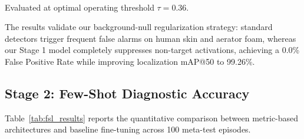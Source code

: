 \documentclass[conference]{IEEEtran}
\begin{document}
\begin{table}[htbp]
\caption{Stage 1 Universal Detector Performance and OOD Rejection}
\label{tab:detector_perf}
\centering
{}
\vspace{1mm}\\
{\footnotesize *Evaluated at optimal operating threshold $\tau = 0.36$.}
\end{table}

The results validate our background-null regularization strategy: standard detectors trigger frequent false alarms on human skin and aerator foam, whereas our Stage 1 model completely suppresses non-target activations, achieving a 0.0\% False Positive Rate while improving localization mAP@50 to 99.26\%.

\subsection{Stage 2: Few-Shot Diagnostic Accuracy}

Table~\ref{tab:fsl_results} reports the quantitative comparison between metric-based architectures and baseline fine-tuning across 100 meta-test episodes.
\end{document}
